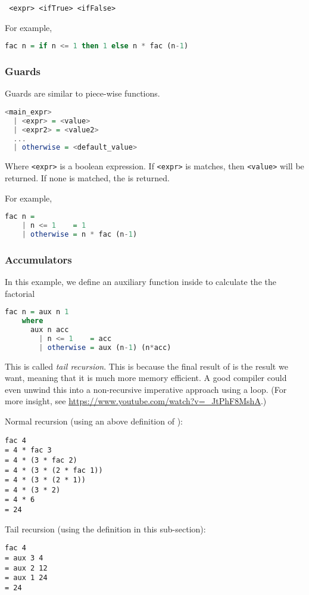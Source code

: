 \begin{center}
  \texttt{ <expr>  <ifTrue>  <ifFalse>}
\end{center}

For example,

\begin{lstlisting}[language=haskell]
  fac n = if n <= 1 then 1 else n * fac (n-1)
\end{lstlisting}

\subsubsection{Guards}
Guards are similar to piece-wise functions.

\begin{lstlisting}[language=haskell]
<main_expr>
  | <expr> = <value>
  | <expr2> = <value2>
  ...
  | otherwise = <default_value>
\end{lstlisting}
Where \texttt{<expr>} is a boolean expression. If \texttt{<expr>} is matches, then \texttt{<value>} will be returned. If none is matched, the \texttt{} is returned.

For example,

\begin{lstlisting}[language=haskell]
  fac n =
    | n <= 1    = 1
    | otherwise = n * fac (n-1)
\end{lstlisting}

\subsubsection{Accumulators}
In this example, we define an auxiliary function \texttt{} inside \texttt{} to calculate the the factorial

\begin{lstlisting}[language=haskell]
  fac n = aux n 1
    where
      aux n acc
        | n <= 1    = acc
        | otherwise = aux (n-1) (n*acc)
\end{lstlisting}

This is called \textit{tail recursion}. This is because the final result of \texttt{} is the result we want, meaning that it is much more memory efficient. A good compiler could even unwind this into a non-recursive imperative approach using a loop. (For more insight, see \url{https://www.youtube.com/watch?v=_JtPhF8MshA}.)

Normal recursion (using an above definition of \texttt{}):
\begin{verbatim}
fac 4
= 4 * fac 3
= 4 * (3 * fac 2)
= 4 * (3 * (2 * fac 1))
= 4 * (3 * (2 * 1))
= 4 * (3 * 2)
= 4 * 6
= 24
\end{verbatim}

Tail recursion (using the definition in this sub-section):
\begin{verbatim}
fac 4
= aux 3 4
= aux 2 12
= aux 1 24
= 24
\end{verbatim}